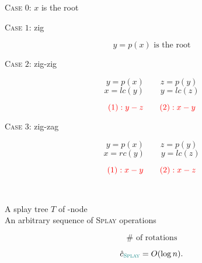 \begin{frame}{}

  \vspace{0.30cm}
  \centerline{\textsc{Case $0$}: $x$ is the root}
\end{frame}

\begin{frame}{}

  \vspace{0.30cm}
  \centerline{\textsc{Case $1$}: zig}
  \[
    y = p(x) \text{ is the root}
  \]
\end{frame}

\begin{frame}{}

  \vspace{0.30cm}
  \centerline{\textsc{Case $2$}: zig-zig}
  \[
    y = p(x) \qquad z = p(y)
  \]
  \[
    x = lc(y) \qquad y = lc(z)
  \]

  \pause
  \[
    \textcolor{red}{(1): y - z \qquad (2): x - y}
  \]
\end{frame}

\begin{frame}{}

  \vspace{0.30cm}
  \centerline{\textsc{Case $3$}: zig-zag}
  \[
    y = p(x) \qquad z = p(y)
  \]
  \[
    x = rc(y) \qquad y = lc(z)
  \]

  \pause
  \[
    \textcolor{red}{(1): x - y \qquad (2): x - z}
  \]
\end{frame}

\begin{frame}{}

  \pause
\end{frame}

\begin{frame}{}
  \begin{center}
     \\[30pt] \pause

    A splay tree $T$ of -node \\[6pt]
    An arbitrary sequence of  \textsc{Splay} operations
  \end{center}

  \pause
  \[
    \# \text{ of rotations}
  \]

  \pause
  \vspace{0.50cm}
  \begin{theorem}
    \[
      \hat{c}_{\textsc{\textcolor{teal}{Splay}}} = O(\log n).
    \]
  \end{theorem}
\end{frame}


